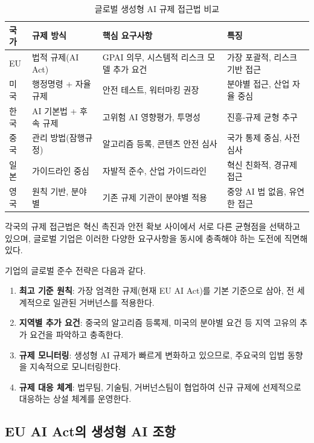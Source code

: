 \begin{table}[htbp]
\centering
\caption{글로벌 생성형 AI 규제 접근법 비교}
\label{tab:gen_global_reg}
\begin{tabularx}{\textwidth}{p{1.5cm}p{2.5cm}p{3cm}X}
\toprule
\textbf{국가} & \textbf{규제 방식} & \textbf{핵심 요구사항} & \textbf{특징} \\
\midrule
EU & 법적 규제(AI Act) & GPAI 의무, 시스템적 리스크 모델 추가 요건 & 가장 포괄적, 리스크 기반 접근 \\
미국 & 행정명령 + 자율규제 & 안전 테스트, 워터마킹 권장 & 분야별 접근, 산업 자율 중심 \\
한국 & AI 기본법\cite{cset2025korea_ai_act} + 후속 규제 & 고위험 AI 영향평가, 투명성 & 진흥-규제 균형 추구 \\
중국 & 관리 방법(잠행규정) & 알고리즘 등록, 콘텐츠 안전 심사 & 국가 통제 중심, 사전 심사 \\
일본 & 가이드라인 중심 & 자발적 준수, 산업 가이드라인 & 혁신 친화적, 경규제 접근 \\
영국 & 원칙 기반, 분야별 & 기존 규제 기관이 분야별 적용 & 중앙 AI 법 없음, 유연한 접근 \\
\bottomrule
\end{tabularx}
\end{table}

각국의 규제 접근법은 혁신 촉진과 안전 확보 사이에서 서로 다른 균형점을 선택하고 있으며, 글로벌 기업은 이러한 다양한 요구사항을 동시에 충족해야 하는 도전에 직면해 있다.

기업의 글로벌 준수 전략은 다음과 같다.
\begin{enumerate}
 \item \textbf{최고 기준 원칙}: 가장 엄격한 규제(현재 EU AI Act)를 기본 기준으로 삼아, 전 세계적으로 일관된 거버넌스를 적용한다.
 \item \textbf{지역별 추가 요건}: 중국의 알고리즘 등록제, 미국의 분야별 요건 등 지역 고유의 추가 요건을 파악하고 충족한다.
 \item \textbf{규제 모니터링}: 생성형 AI 규제가 빠르게 변화하고 있으므로, 주요국의 입법 동향을 지속적으로 모니터링한다.
 \item \textbf{규제 대응 체계}: 법무팀, 기술팀, 거버넌스팀이 협업하여 신규 규제에 선제적으로 대응하는 상설 체계를 운영한다.
\end{enumerate}

\subsection{EU AI Act의 생성형 AI 조항}
\label{sec:gen.4.1}

